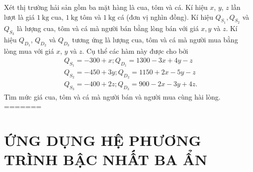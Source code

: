 \begin{bt}%
 Xét thị trường hải sản gồm ba mặt hàng là cua, tôm và cá. Kí hiệu $x$, $y$, $z$ lần lượt là giá $1 \mathrm{~kg}$ cua, $1 \mathrm{~kg}$ tôm và $1 \mathrm{~kg}$ cá (đơn vị nghìn đồng). Kí hiệu $Q_{S_1}, Q_{S_2}$ và $Q_{S_3}$ là lượng cua, tôm và cá mà người bán bằng lòng bán với giá $x, y$ và $z$. Kí hiệu $Q_{D_1}$, $Q_{D_2}$ và $Q_{D_3}$ tương ứng là lượng cua, tôm và cá mà người mua bằng lòng mua với giá $x$, $y$ và $z$. Cụ thể các hàm này được cho bởi
	$$
	\begin{aligned}
		&Q_{S_1}=-300+x ; Q_{D_1}=1300-3 x+4 y-z \\
		&Q_{S_2}=-450+3 y ; Q_{D_2}=1150+2 x-5 y-z \\
		&Q_{S_3}=-400+2 z ; Q_{D_3}=900-2 x-3 y+4 z.
	\end{aligned}
	$$
	Tìm mức giá cua, tôm và cá mà người bán và người mua cùng hài lòng.
=======
\section{ỨNG DỤNG HỆ PHƯƠNG TRÌNH BẬC NHẤT BA ẨN}

\end{bt}
